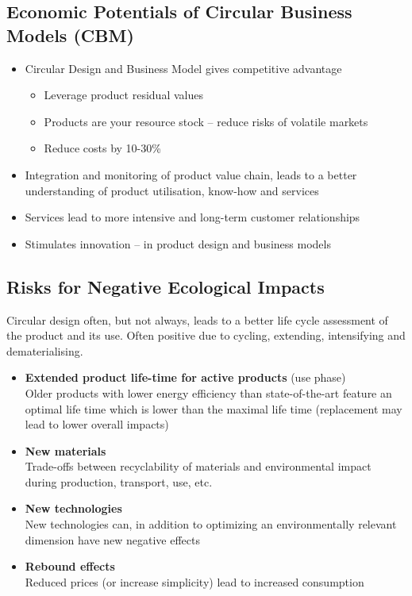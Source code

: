 \documentclass[11pt]{article}
\theoremstyle{definition}
\begin{document}
\subsection{Economic Potentials of Circular Business Models (CBM)}
\begin{itemize}
	\item Circular Design and Business Model gives competitive advantage
	\begin{itemize}
		\item Leverage product residual values
		\item Products are your resource stock – reduce risks of volatile markets
		\item Reduce costs by 10-30\% 
	\end{itemize}
	\item Integration and monitoring of product value chain, leads to a better understanding of product utilisation, know-how and services
	\item Services lead to more intensive and long-term customer relationships
	\item Stimulates innovation -- in product design and business models
\end{itemize}

\subsection{Risks for Negative Ecological Impacts}
Circular design often, but not always, leads to a better life cycle assessment of the product and its use. Often positive due to cycling, extending, intensifying and dematerialising.
\begin{itemize}
	\item \textbf{Extended product life-time for active products} (use phase)\\
	Older products with lower energy efficiency than state-of-the-art feature an optimal life time which is lower than the maximal life time (replacement may lead to lower overall impacts)
	\item \textbf{New materials}\\
	Trade-offs between recyclability of materials and environmental impact during production, transport, use, etc.
	\item \textbf{New technologies}\\
	New technologies can, in addition to optimizing an environmentally relevant dimension have new negative effects
	\item \textbf{Rebound effects}\\
	Reduced prices (or increase simplicity) lead to increased consumption
\end{itemize}
\end{document}
